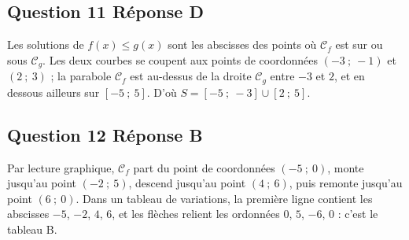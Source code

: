 \subsection*{Question 11 \quad Réponse D}

Les solutions de $f(x) \leqslant g(x)$ sont les abscisses des points où $\mathcal{C}_f$ est
sur ou sous $\mathcal{C}_g$. Les deux courbes se coupent aux points de coordonnées
$(-3~;~-1)$ et $(2~;~3)$ ; la parabole $\mathcal{C}_f$ est au-dessus de la droite
$\mathcal{C}_g$ entre $-3$ et $2$, et en dessous ailleurs sur $[-5~;~5]$. D'où
$S = [-5~;~-3] \cup [2~;~5]$.

\subsection*{Question 12 \quad Réponse B}

Par lecture graphique, $\mathcal{C}_f$ part du point de coordonnées $(-5~;~0)$, monte jusqu'au point $(-2~;~5)$, descend jusqu'au point $(4~;~6)$, puis remonte jusqu'au point $(6~;~0)$. Dans un tableau de variations, la première ligne contient les abscisses $-5$, $-2$, $4$, $6$,
et les flèches relient les ordonnées $0$, $5$, $-6$, $0$ : c'est le tableau B.
